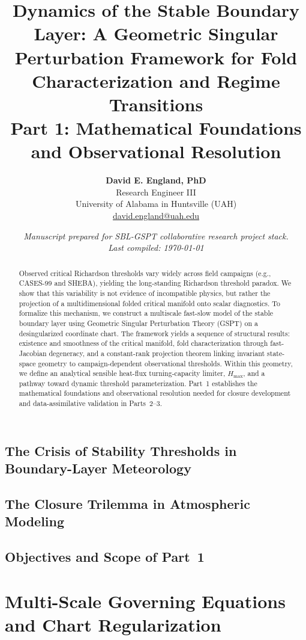 \documentclass[11pt,letterpaper]{article}
\title{\textbf{Dynamics of the Stable Boundary Layer: A Geometric Singular Perturbation Framework for Fold Characterization and Regime Transitions}\\
\large Part 1: Mathematical Foundations and Observational Resolution}
\author{
    \textbf{David E. England, PhD} \\
    \small Research Engineer III \\
    \small University of Alabama in Huntsville (UAH) \\
    \small \href{mailto:david.england@uah.edu}{david.england@uah.edu}
}
\date{\small\itshape Manuscript prepared for SBL-GSPT collaborative research project stack. \\ Last compiled: \today}
\begin{document}
\maketitle

\begin{abstract}
Observed critical Richardson thresholds vary widely across field campaigns (e.g., CASES-99 and SHEBA), yielding the long-standing Richardson threshold paradox. We show that this variability is not evidence of incompatible physics, but rather the projection of a multidimensional folded critical manifold onto scalar diagnostics. To formalize this mechanism, we construct a multiscale fast-slow model of the stable boundary layer using Geometric Singular Perturbation Theory (GSPT) on a desingularized coordinate chart. The framework yields a sequence of structural results: existence and smoothness of the critical manifold, fold characterization through fast-Jacobian degeneracy, and a constant-rank projection theorem linking invariant state-space geometry to campaign-dependent observational thresholds. Within this geometry, we define an analytical sensible heat-flux turning-capacity limiter, $H_{\max}$, and a pathway toward dynamic threshold parameterization. Part~1 establishes the mathematical foundations and observational resolution needed for closure development and data-assimilative validation in Parts~2--3.
\end{abstract}



\subsection{The Crisis of Stability Thresholds in Boundary-Layer Meteorology}

\subsection{The Closure Trilemma in Atmospheric Modeling}

\subsection{Objectives and Scope of Part~1}

\section{Multi-Scale Governing Equations and Chart Regularization}
\label{sec:governing}

\end{document}
